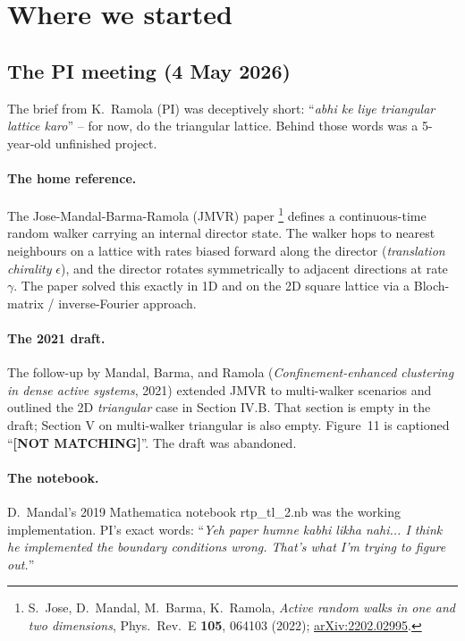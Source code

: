 \documentclass[11pt,a4paper]{article}
\begin{document}
\section{Where we started}\label{sec:start}

\subsection{The PI meeting (4 May 2026)}\label{ssec:meeting}

The brief from K.~Ramola (PI) was deceptively short: ``\emph{abhi ke
liye triangular lattice karo}'' -- for now, do the triangular lattice.
Behind those words was a 5-year-old unfinished project.

\paragraph{The home reference.} The Jose-Mandal-Barma-Ramola (JMVR)
paper%
\footnote{S.~Jose, D.~Mandal, M.~Barma, K.~Ramola,
\emph{Active random walks in one and two dimensions}, Phys.\ Rev.\ E
\textbf{105}, 064103 (2022);
\href{https://arxiv.org/abs/2202.02995}{arXiv:2202.02995}.} defines a
continuous-time random walker carrying an internal director state. The
walker hops to nearest neighbours on a lattice with rates biased
forward along the director (\emph{translation chirality} $\epsilon$),
and the director rotates symmetrically to adjacent directions at rate
$\gamma$. The paper solved this exactly in 1D and on the 2D square
lattice via a Bloch-matrix / inverse-Fourier approach.

\paragraph{The 2021 draft.} The follow-up by Mandal, Barma, and Ramola
(\emph{Confinement-enhanced clustering in dense active systems}, 2021)
extended JMVR to multi-walker scenarios and outlined the 2D
\emph{triangular} case in Section IV.B. That section is empty in the
draft; Section V on multi-walker triangular is also empty. Figure~11 is
captioned ``\textbf{[NOT MATCHING]}''. The draft was abandoned.

\paragraph{The notebook.} D.~Mandal's 2019 Mathematica notebook
{\sf rtp\_tl\_2.nb} was the working implementation. PI's exact words:
``\emph{Yeh paper humne kabhi likha nahi... I think he implemented the
boundary conditions wrong. That's what I'm trying to figure out.}''
\end{document}
